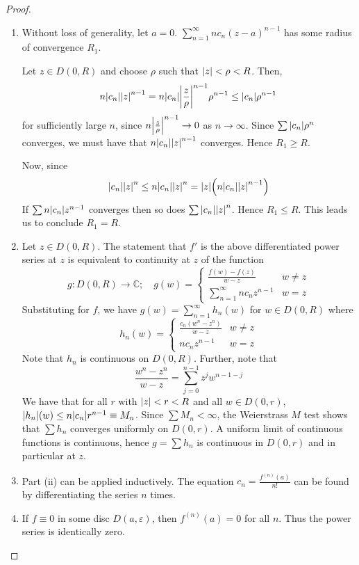 \begin{proof}
	\begin{enumerate}
		\item Without loss of generality, let \( a = 0 \).
		      \( \sum_{n=1}^\infty nc_n(z-a)^{n-1} \) has some radius of convergence \( R_1 \).

		      Let \( z \in D(0,R) \) and choose \( \rho \) such that \( \abs{z} < \rho < R \).
		      Then,
		      \[
			      n \abs{c_n}\abs{z}^{n-1} = n \abs{c_n} \abs{\frac{z}{\rho}}^{n-1} \rho^{n-1} \leq \abs{c_n} \rho^{n-1}
		      \]
		      for sufficiently large \( n \), since \( n \abs{\frac{z}{\rho}}^{n-1} \to 0 \) as \( n \to \infty \).
		      Since \( \sum \abs{c_n} \rho^n \) converges, we must have that \( n \abs{c_n}\abs{z}^{n-1} \) converges.
		      Hence \( R_1 \geq R \).

		      Now, since
		      \[
			      \abs{c_n}\abs{z}^n \leq n \abs{c_n}\abs{z}^n = \abs{z}\qty(n \abs{c_n}\abs{z}^{n-1})
		      \]
		      If \( \sum n\abs{c_n}{z}^{n-1} \) converges then so does \( \sum \abs{c_n}\abs{z}^n \).
		      Hence \( R_1 \leq R \).
		      This leads us to conclude \( R_1 = R \).
		\item Let \( z \in D(0,R) \).
		      The statement that \( f' \) is the above differentiated power series at \( z \) is equivalent to continuity at \( z \) of the function
		      \[
			      g \colon D(0,R) \to \mathbb C;\quad g(w) = \begin{cases}
				      \frac{f(w) - f(z)}{w - z}       & w \neq z \\
				      \sum_{n=1}^\infty n c_n z^{n-1} & w = z
			      \end{cases}
		      \]
		      Substituting for \( f \), we have \( g(w) = \sum_{n=1}^\infty h_n(w) \) for \( w \in D(0,R) \) where
		      \[
			      h_n(w) = \begin{cases}
				      \frac{c_n(w^n - z^n)}{w - z} & w \neq z \\
				      n c_n z^{n-1}                & w = z
			      \end{cases}
		      \]
		      Note that \( h_n \) is continuous on \( D(0,R) \).
		      Further, note that
		      \[
			      \frac{w^n - z^n}{w - z} = \sum_{j=0}^{n-1} z^j w^{n-1-j}
		      \]
		      We have that for all \( r \) with \( \abs{z} < r < R \) and all \( w \in D(0,r) \), \( \abs{h_n}(w) \leq n \abs{c_n} r^{n-1} \equiv M_n \).
		      Since \( \sum M_n < \infty \), the Weierstrass \( M \) test shows that \( \sum h_n \) converges uniformly on \( D(0,r) \).
		      A uniform limit of continuous functions is continuous, hence \( g = \sum h_n \) is continuous in \( D(0,r) \) and in particular at \( z \).
		\item Part (ii) can be applied inductively.
		      The equation \( c_n = \frac{f^{(n)}(a)}{n!} \) can be found by differentiating the series \( n \) times.
		\item If \( f \equiv 0 \) in some disc \( D(a, \varepsilon) \), then \( f^{(n)}(a) = 0 \) for all \( n \).
		      Thus the power series is identically zero.
	\end{enumerate}
\end{proof}

